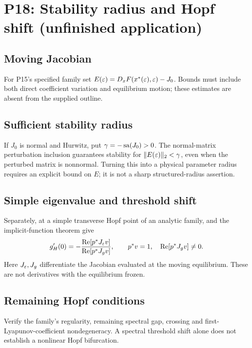 \section{P18: Stability radius and Hopf shift (unfinished application)}
\label{sec:P18}
\subsection{Moving Jacobian}\label{slot:P18-1}
For P15's specified family set
$E(\varepsilon)=D_xF(x^*(\varepsilon),\varepsilon)-J_0$. Bounds must include both direct
coefficient variation and equilibrium motion; these estimates are absent
from the supplied outline.
\subsection{Sufficient stability radius}\label{slot:P18-2}
If $J_0$ is normal and Hurwitz, put $\gamma=-\operatorname{sa}(J_0)>0$.
The normal-matrix perturbation inclusion
\cite[\S1 and Theorem~$4_\eps$]{EmbreeTrefethen2001} guarantees
stability for $\|E(\varepsilon)\|_2<\gamma$, even when the perturbed matrix
is nonnormal. Turning this into a physical parameter radius requires
an explicit bound on $E$; it is not a sharp structured-radius assertion.
\subsection{Simple eigenvalue and threshold shift}\label{slot:P18-3}
Separately, at a simple transverse Hopf point of an analytic family,
\cite[Theorem~1]{GreenbaumLiOverton2020} and the implicit-function
theorem give
\[
 g_H'(0)=-\frac{\operatorname{Re}[p^*J_\varepsilon v]}{\operatorname{Re}[p^*J_gv]},\qquad
 p^*v=1,\quad\operatorname{Re}[p^*J_gv]\ne0.
\]
Here $J_\varepsilon,J_g$ differentiate the Jacobian evaluated at the moving
equilibrium. These are not derivatives with the equilibrium frozen.
\subsection{Remaining Hopf conditions}\label{slot:P18-4}
Verify the family's regularity, remaining spectral gap, crossing and
first-Lyapunov-coefficient nondegeneracy. A spectral threshold shift alone
does not establish a nonlinear Hopf bifurcation.
